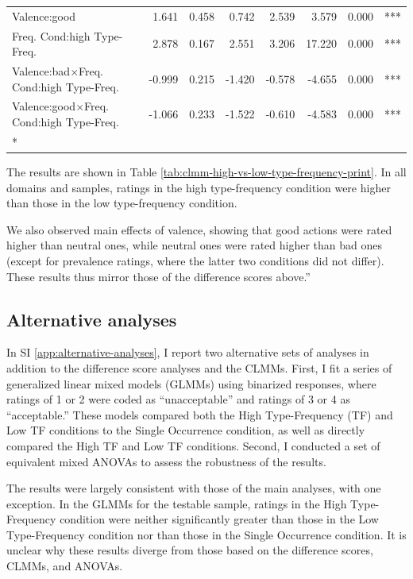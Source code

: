 \documentclass[
]{article}
\begin{document}
\begin{longtable}[t]{lrrrrrrl}
\hspace{1em}Valence:good & 1.641 & 0.458 & 0.742 & 2.539 & 3.579 & 0.000 & ***\\
Freq.
Cond:high
\hspace{1em}Type-Freq. & 2.878 & 0.167 & 2.551 & 3.206 & 17.220 & 0.000 & ***\\
Valence:bad$\times$Freq.
Cond:high
\hspace{1em}Type-Freq. & -0.999 & 0.215 & -1.420 & -0.578 & -4.655 & 0.000 & ***\\
Valence:good$\times$Freq.
Cond:high
\hspace{1em}Type-Freq. & -1.066 & 0.233 & -1.522 & -0.610 & -4.583 & 0.000 & ***\\*
\end{longtable}

The results are shown in Table \ref{tab:clmm-high-vs-low-type-frequency-print}. In all domains and samples, ratings in the high type-frequency condition were higher than those in the low type-frequency condition.

We also observed main effects of valence, showing that good actions were rated higher than neutral ones, while neutral ones were rated higher than bad ones (except for prevalence ratings, where the latter two conditions did not differ).
These results thus mirror those of the difference scores above.''

\clearpage

\subsection{Alternative analyses}\label{alternative-analyses}

In SI \ref{app:alternative-analyses}, I report two alternative sets of analyses in addition to the difference score analyses and the CLMMs. First, I fit a series of generalized linear mixed models (GLMMs) using binarized responses, where ratings of 1 or 2 were coded as ``unacceptable'' and ratings of 3 or 4 as ``acceptable.'' These models compared both the High Type-Frequency (TF) and Low TF conditions to the Single Occurrence condition, as well as directly compared the High TF and Low TF conditions. Second, I conducted a set of equivalent mixed ANOVAs to assess the robustness of the results.

The results were largely consistent with those of the main analyses, with one exception. In the GLMMs for the testable sample, ratings in the High Type-Frequency condition were neither significantly greater than those in the Low Type-Frequency condition nor than those in the Single Occurrence condition. It is unclear why these results diverge from those based on the difference scores, CLMMs, and ANOVAs.
\end{document}
